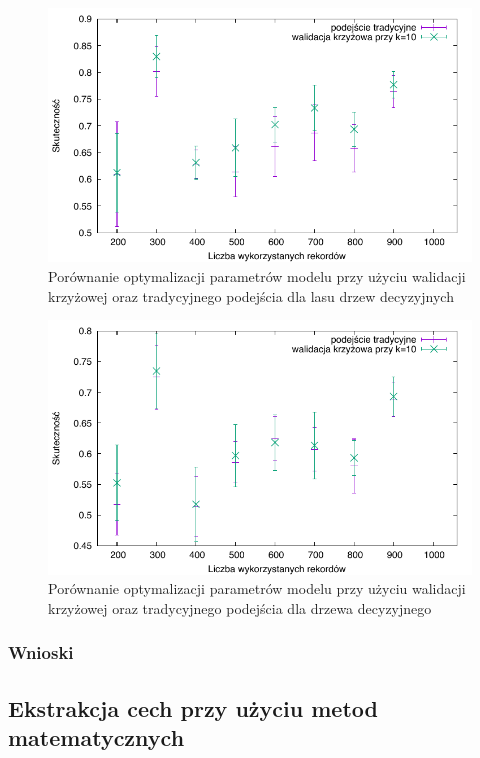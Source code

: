 \begin{figure}
\centering
\includegraphics[scale=\cvsize]{res/cv_forest.pdf}
\caption[Caption for LOF]{Porównanie optymalizacji parametrów modelu przy użyciu walidacji krzyżowej oraz tradycyjnego podejścia dla lasu drzew decyzyjnych\label{cv_forest}}
\end{figure}

\begin{figure}
\centering
\includegraphics[scale=\cvsize]{res/cv_tree.pdf}
\caption[Caption for LOF]{Porównanie optymalizacji parametrów modelu przy użyciu walidacji krzyżowej oraz tradycyjnego podejścia dla drzewa decyzyjnego\label{cv_tree}}
\end{figure}
  


\subsubsection{Wnioski}

\subsection{Ekstrakcja cech przy użyciu metod matematycznych}

